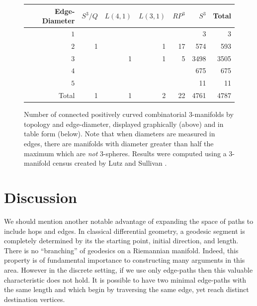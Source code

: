 \documentclass[12pt]{article}
\theoremstyle{plain}
\theoremstyle{definition}
\theoremstyle{remark}
\begin{document}
\begin{figure}
    \begin{center}
    {
	    \setlength\fboxsep{15pt}
		\setlength\fboxrule{0pt}
    }
    \renewcommand{\arraystretch}{1.2}
	\begin{tabular} {| r | r | r | r | r | r | r |}	
		\hline
		Edge-Diameter & $S^{3}/Q$ & $L(4,1)$ & $L(3,1)$ & $RP^{3}$ & $S^{3}$ & Total \\
		\hline
		\hline
		$1$ &  &  &  &   &3    & 3    \\
		$2$ & 1&  &1 &17 &574  & 593  \\
		$3$ &  &1 &1 &5  &3498 & 3505 \\
		$4$ &  &  &  &   &675  & 675   \\
		$5$ &  &  &  &   &11   & 11   \\
		\hline
		Total&1 &1 &2 &22   &4761   &4787  \\
		\hline
	\end{tabular}
    \end{center}
    \caption{Number of connected positively curved combinatorial 3-manifolds by topology and edge-diameter, displayed graphically (above) and in table form (below). Note that when diameters are measured in edges, there are manifolds with diameter greater than half the maximum which are {\em not} 3-spheres. Results were computed using a 3-manifold census created by Lutz and Sullivan \cite{LutzSul_unpub}.}
	\label{fig:type_statistics_edges}
\end{figure}

\section{Discussion}
We should mention another notable advantage of expanding the space of paths to include hops and edges. In classical differential geometry, a geodesic segment is completely determined by its the starting point, initial direction, and length. There is no ``branching'' of geodesics on a Riemannian manifold. Indeed, this property is of fundamental importance to constructing many arguments in this area. However in the discrete setting, if we use only edge-paths then this valuable characteristic does not hold. It is possible to have two minimal edge-paths with the same length and which begin by traversing the same edge, yet reach distinct destination vertices.
\end{document}
